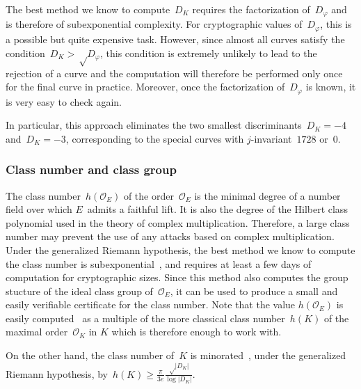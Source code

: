 \documentclass[twocolumn,letterpaper]{article}
\let\ro\mathcal
\def\abs#1{\left|#1\right|}
\def\pa#1{\left(#1\right)}
\begin{document}
The best method we know to compute~$D_K$ requires the
factorization of~$D_φ$ and is therefore of subexponential complexity.
For cryptographic values of~$D_φ$, this is a possible but
quite expensive task.
However, since almost all curves satisfy the condition~$D_K > √{D_φ}$,
this condition is extremely unlikely to lead to the rejection of a curve
and the computation will therefore be performed only once for the final curve
in practice.
Moreover, once the factorization of~$D_φ$ is known,
it is very easy to check again.

In particular, this approach eliminates
the two smallest discriminants~$D_K = -4$ and~$D_K = -3$,
corresponding to the special curves with $j$-invariant~$1728$ or~$0$.

\subsubsection{Class number and class group}
\label{sss:class-group}

The class number~$h(\ro O_E)$ of the order~$\ro O_E$
is the minimal degree of a number field
over which $E$~admits a faithful lift.
It is also the degree of the Hilbert class polynomial
used in the theory of complex multiplication.
Therefore, a large class number may prevent the use
of any attacks based on complex multiplication.
Under the generalized Riemann hypothesis,
the best method we know to compute the class number
is subexponential~\cite{ams1989hmc,chile2009biasse},
and requires at least a few days of computation for cryptographic sizes.
Since this method also computes the group stucture
of the ideal class group of~$\ro O_E$,
it can be used to produce a small and easily verifiable certificate
for the class number.
Note that the value $h(\ro O_E)$ is easily computed~\cite[7.24]{cox1989primes}
as a multiple of the more classical class number~$h(K)$
of the maximal order~$\ro O_K$ in $K$
which is therefore enough to work with.

On the other hand,
the class number of~$K$ is minorated~\cite{cras1990louboutin},
under the generalized Riemann hypothesis,
by~$h(K) ≥ \frac{π}{3e} \frac{√{\abs{D_K}}}{\log \abs{D_K}}$.

\medbreak
\end{document}
